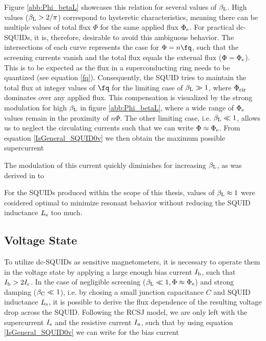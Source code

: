 Figure \ref{abb:Phi_betaL} showcases this relation for several values of $\beta_{\rm L}$. High values ($\beta_{\rm L}>2/\pi$) correspond to hysteretic characteristics, meaning there can be multiple values of total flux $\Phi$ for the same applied flux $\Phi_{\rm e}$. For practical dc-SQUIDs, it is, therefore, desirable to avoid this ambiguous behavior. The intersections of each curve represents the case for $\Phi = n\unit{\fq}$, such that the screening currents vanish and the total flux equals the external flux ($\Phi=\Phi_{\rm e}$). This is to be expected as the flux in a superconducting ring needs to be quantized (see equation \ref{fq}). Consequently, the SQUID tries to maintain the total flux at integer values of $\unit{\fq}$ for the limiting case of $\beta_{\rm L}\gg 1$, where $\Phi_{\rm cir}$ dominates over any applied flux. This compensation is visualized by the strong modulation for high $\beta_{\rm L}$ in figure \ref{abb:Phi_betaL}, where a wide range of $\Phi_{\rm e}$ values remain in the proximity of $n\Phi$. The other limiting case, i.e. $\beta_{\rm L}\ll 1$, allows us to neglect the circulating currents such that we can write $\Phi \approx \Phi_{\rm e}$. From equation \ref{IsGeneral_SQUID0v} we then obtain the maximum possible supercurrent 


The modulation of this current quickly diminishes for increasing $\beta_{\rm L}$, as was derived in \cite{Clarke2004} to 


For the SQUIDs produced within the scope of this thesis, values of $\beta_{\rm L}\approx 1$ were cosidered optimal to minimize resonant behavior without reducing the SQUID inductance $L_{\rm s}$ too much. 

\subsection{Voltage State} \label{sec_voltagestate}

To utilize dc-SQUIDs as sensitive magnetometers, it is necessary to operate them in the voltage state by applying a large enough bias current $I_{\rm b}$, such that $I_{\rm b}>2I_{\rm c}$. In the case of negligible screening ($\beta_{\rm L}\ll 1, \Phi\approx\Phi_{\rm e}$) and strong damping ($\beta_{\rm C}\ll 1$), i.e. by chosing a small junction capacitance $C$ and SQUID inductance $L_{\rm s}$, it is possible to derive the flux dependence of the resulting voltage drop across the SQUID. Following the RCSJ model, we are only left with the supercurrent $I_{\rm s}$ and the resistive current $I_{\rm n}$, such that by using equation \ref{IsGeneral_SQUID0v} we can write for the bias current 

